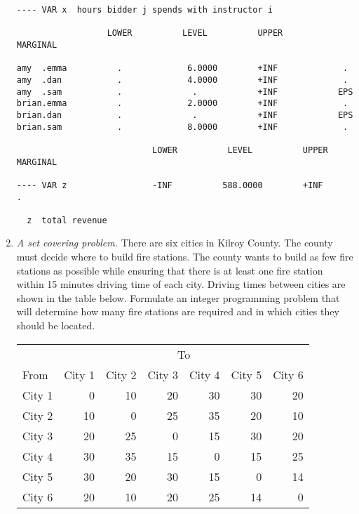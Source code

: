 \begin{enumerate}
\begin{solution}
\begin{Verbatim}
---- VAR x  hours bidder j spends with instructor i

                  LOWER          LEVEL          UPPER         MARGINAL

amy  .emma          .             6.0000        +INF             .          
amy  .dan           .             4.0000        +INF             .          
amy  .sam           .              .            +INF            EPS         
brian.emma          .             2.0000        +INF             .          
brian.dan           .              .            +INF            EPS         
brian.sam           .             8.0000        +INF             .          

                           LOWER          LEVEL          UPPER         MARGINAL

---- VAR z                 -INF          588.0000        +INF             .          

  z  total revenue
\end{Verbatim}
\end{solution}

\item \emph{A set covering problem.}
There are six cities in Kilroy County. The county must decide where to build fire
stations. The county wants to build as few fire stations as possible
while ensuring that there is at least one fire station within 15 minutes driving
time of each city. Driving times between cities are shown in the table below.
Formulate an integer programming problem that will determine how many fire
stations are required and in which cities they should be located.

\begin{center}
\begin{tabular}{l|rrrrrr}
 & \multicolumn{6}{c}{To} \\
From & City 1 & City 2 & City 3 & City 4 & City 5 & City 6 \\ \hline
City 1 & 0 & 10 & 20 & 30 & 30 & 20 \\
City 2 & 10 & 0 & 25 & 35 & 20 & 10 \\
City 3 & 20 & 25 & 0 & 15 & 30 & 20 \\
City 4 & 30 & 35 & 15 & 0 & 15 & 25 \\
City 5 & 30 & 20 & 30 & 15 & 0 & 14 \\
City 6 & 20 & 10 & 20 & 25 & 14 & 0 \\
\end{tabular}
\end{center}


\end{enumerate}
